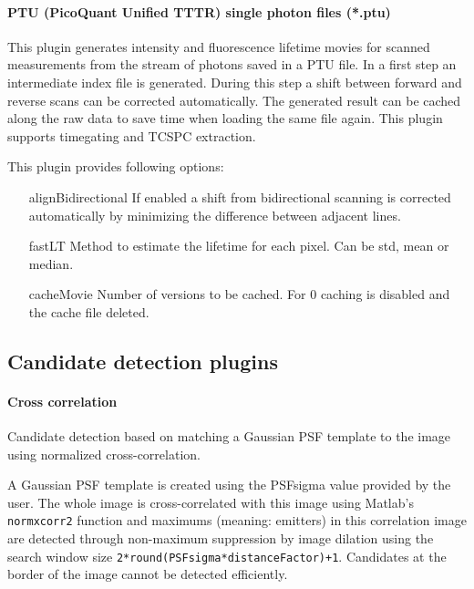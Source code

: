 \documentclass[11pt,onside]{report}
\numberwithin{equation}{chapter}
\begin{document}
\paragraph{PTU (PicoQuant Unified TTTR) single photon files (*.ptu)}
This plugin generates intensity and fluorescence lifetime movies for scanned measurements from the stream of photons saved in a PTU file. In a first step an intermediate index file is generated. During this step a shift between forward and reverse scans can be corrected automatically. The generated result can be cached along the raw data to save time when loading the same file again. This plugin supports timegating and TCSPC extraction.

This plugin provides following options:
\begin{itemize}[leftmargin=3cm]
\item[\textsf{alignBidirectional}] If enabled a shift from bidirectional scanning is corrected automatically by minimizing the difference between adjacent lines.
\item[\textsf{fastLT}] Method to estimate the lifetime for each pixel. Can be \textsf{std}, \textsf{mean} or \textsf{median}.
\item[\textsf{cacheMovie}] Number of versions to be cached. For 0 caching is disabled and the cache file deleted.
\end{itemize}

\subsection{Candidate detection plugins}

\paragraph{Cross correlation}
Candidate detection based on matching a Gaussian PSF template to the image using normalized cross-correlation. 

A Gaussian PSF template is created using the PSFsigma value provided by the user. The whole image is cross-correlated with this image using Matlab's \texttt{normxcorr2} function and maximums (meaning: emitters) in this correlation image are detected through non-maximum suppression by image dilation using the search window size \texttt{2*round(PSFsigma*distanceFactor)+1}. 
Candidates at the border of the image cannot be detected efficiently.
\end{document}
